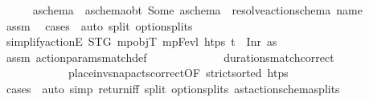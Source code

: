 \begin{isabellebody}
\ \ \ \ \isamarkupfalse%
\ a\isactrlsub s\isactrlsub c\isactrlsub h\isactrlsub e\isactrlsub m\isactrlsub a\ \ a\isactrlsub s\isactrlsub c\isactrlsub h\isactrlsub e\isactrlsub m\isactrlsub a{\isacharunderscore}{\kern0pt}obt{\isacharcolon}{\kern0pt}\ {\isachardoublequoteopen}Some\ a\isactrlsub s\isactrlsub c\isactrlsub h\isactrlsub e\isactrlsub m\isactrlsub a\ {\isacharequal}{\kern0pt}\ resolve{\isacharunderscore}{\kern0pt}action{\isacharunderscore}{\kern0pt}schema\ {\isacharparenleft}{\kern0pt}name\ {\isasympi}{\isacharparenright}{\kern0pt}{\isachardoublequoteclose}\isanewline
\ \ \ \ \ \ \isamarkupfalse%
\ assm{}\ \isamarkupfalse%
\ {\isacharparenleft}{\kern0pt}cases\ {\isasympi}{\isacharparenright}{\kern0pt}\ {\isacharparenleft}{\kern0pt}auto\ split{\isacharcolon}{\kern0pt}\ option{\isachardot}{\kern0pt}splits{\isacharparenright}{\kern0pt}\isanewline
\ \ \ \ \isamarkupfalse%
\ \isamarkupfalse%
\ {\isachardoublequoteopen}simplify{\isacharunderscore}{\kern0pt}actionE\ STG\ mp{\isacharunderscore}{\kern0pt}objT\ mp{\isacharunderscore}{\kern0pt}Fevl\ htps\ {\isacharparenleft}{\kern0pt}t\isactrlsub {\isasympi}{\isacharcomma}{\kern0pt}{\isasympi}{\isacharparenright}{\kern0pt}\ {\isacharequal}{\kern0pt}\ Inr\ as{\isachardoublequoteclose}\isanewline
\ \ \ \ \ \ \isamarkupfalse%
\ assm{}\ action{\isacharunderscore}{\kern0pt}params{\isacharunderscore}{\kern0pt}match{\isacharunderscore}{\kern0pt}def\ \isanewline
\ \ \ \ \ \ \ \ \ \ \ \ durations{\isacharunderscore}{\kern0pt}match{\isacharprime}{\kern0pt}{\isacharunderscore}{\kern0pt}correct\ \isanewline
\ \ \ \ \ \ \ \ \ \ \ \ place{\isacharunderscore}{\kern0pt}inv{\isacharunderscore}{\kern0pt}snap{\isacharunderscore}{\kern0pt}acts{\isacharunderscore}{\kern0pt}correct{\isacharbrackleft}{\kern0pt}OF\ {\isacartoucheopen}strict{\isacharunderscore}{\kern0pt}sorted\ htps{\isacartoucheclose}{\isacharbrackright}{\kern0pt}\isanewline
\ \ \ \ \ \ \isamarkupfalse%
\ {\isacharparenleft}{\kern0pt}cases\ {\isasympi}{\isacharparenright}{\kern0pt}\ {\isacharparenleft}{\kern0pt}auto\ simp{\isacharcolon}{\kern0pt}\ return{\isacharunderscore}{\kern0pt}iff\ split{\isacharcolon}{\kern0pt}\ option{\isachardot}{\kern0pt}splits\ ast{\isacharunderscore}{\kern0pt}action{\isacharunderscore}{\kern0pt}schema{\isachardot}{\kern0pt}splits{\isacharparenright}{\kern0pt}\isanewline
\ \ \isamarkupfalse%
%
\endisatagproof
{\isafoldproof}%
%
\isadelimproof

\end{isabellebody}
